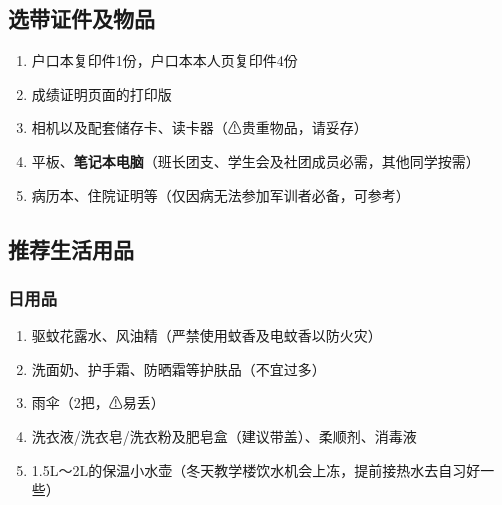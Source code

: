 \subsection[选带证件及物品]{选带证件及物品}
\begin{enumerate}
    \item 户口本复印件1份，户口本本人页复印件4份\footnotemark
    \item 成绩证明页面的打印版\footnotemark
    \item 相机以及配套储存卡、读卡器（⚠贵重物品，请妥存）
    \item 平板\footnotemark、\textbf{笔记本电脑}（班长团支、学生会及社团成员必需，其他同学按需）
    \item 病历本、住院证明等（仅因病无法参加军训者必备，可参考）
\end{enumerate}

\subsection[推荐生活用品]{推荐生活用品}

\subsubsection[日用品]{日用品}
\begin{enumerate}
    \item 驱蚊花露水、风油精（严禁使用蚊香及电蚊香以防火灾）
    \item 洗面奶、护手霜、防晒霜等护肤品（不宜过多）
    \item 雨伞（2把，⚠易丢）
    \item 洗衣液/洗衣皂/洗衣粉及肥皂盒（建议带盖）、柔顺剂、消毒液
    \item 1.5L～2L的保温小水壶（冬天教学楼饮水机会上冻，提前接热水去自习好一些）
\end{enumerate}

